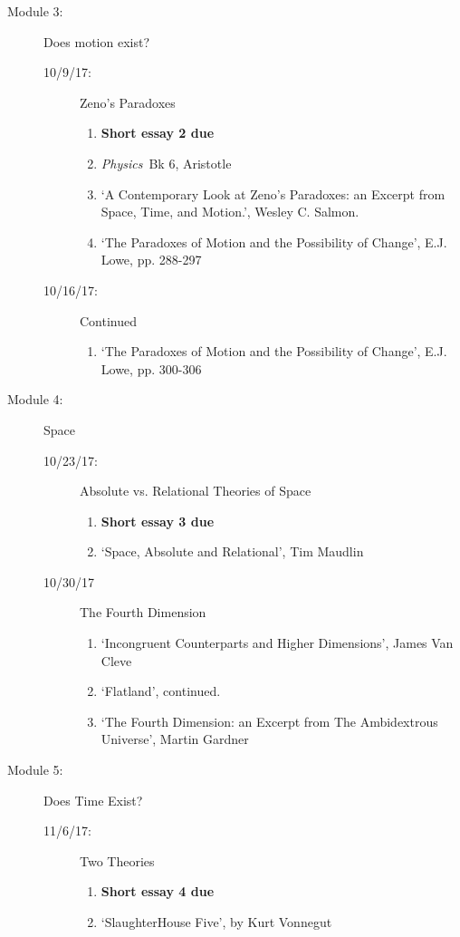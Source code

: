 \documentclass[article,oneside]{memoir}
\begin{document}
\begin{description}
\begin{description}
\end{description}

\item[Module 3:] Does motion exist? 
\begin{description}
\item [10/9/17:] Zeno's Paradoxes
\begin{enumerate}
\item \textbf{Short essay 2 due}
\item \emph{Physics}\ Bk 6, Aristotle
\item `A Contemporary Look at Zeno’s Paradoxes: an Excerpt from Space, Time, and Motion.', Wesley C. Salmon. 
\item `The Paradoxes of Motion and the Possibility of Change', E.J. Lowe, pp. 288-297
\end{enumerate}

\item[10/16/17:] Continued
\begin{enumerate}
\item `The Paradoxes of Motion and the Possibility of Change', E.J. Lowe, pp. 300-306
\end{enumerate}
\end{description}

\item[Module 4:] Space 
\begin{description}
\item[10/23/17:] Absolute vs. Relational Theories of Space
\begin{enumerate}
\item \textbf{Short essay 3 due}
\item `Space, Absolute and Relational', Tim Maudlin
\end{enumerate}

\item[10/30/17] The Fourth Dimension
\begin{enumerate} 
\item `Incongruent Counterparts and Higher Dimensions', James Van Cleve
\item `Flatland', continued.
\item `The Fourth Dimension: an Excerpt from The Ambidextrous Universe', Martin Gardner
\end{enumerate}
\end{description}


\item[Module 5:] Does Time Exist? 
\begin{description}
\item [11/6/17:] Two Theories
\begin{enumerate}
\item \textbf{Short essay 4 due}
\item `SlaughterHouse Five', by Kurt Vonnegut
\end{enumerate}


\end{description}
\end{description}
\end{document}
